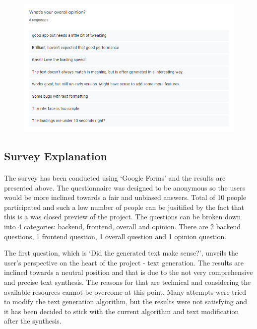 \documentclass[12pt]{report}
\begin{document}
\begin{appendices}
\begin{figure}[ht]
  \label{fig:feedback3}
\end{figure}
\begin{figure}[ht]
  \centering
  \includegraphics[width=.8\linewidth]{img/feedback4.png}
  \label{fig:feedback4}
\end{figure}

\clearpage

\subsection*{Survey Explanation}
\label{appendix:survey_explanation}
\paragraph{}
The survey has been conducted using `Google Forms' and the results are presented above. The questionnaire was designed to be anonymous so the users would be more
inclined towards a fair and unbiased answers. Total of 10 people participated and such a low number of people can be jusitified by the fact that this is
a was closed preview of the project. The questions can be broken down into 4 categories: backend, frontend, overall and 
opinion. There are 2 backend questions, 1 frontend question, 1 overall question and 1 opinion question.

The first question, which is `Did the generated text make sense?', unveils the user's perspective on the heart of the project -
text generation. The results are inclined towards a neutral position and that is due to the not very comprehensive and
precise text synthesis. The reasons for that are technical and considering the available resources cannot be overcome at this
point. Many attempts were tried to modify the text generation algorithm, but the results were not satisfying and it has been
decided to stick with the current algorithm and text modification after the synthesis.


\end{appendices}
\end{document}
